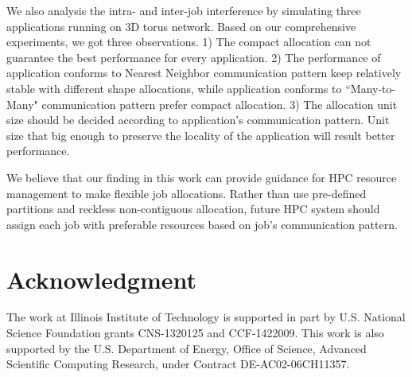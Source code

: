 \documentclass[conference]{IEEEtran}
\begin{document}
We also analysis the intra- and inter-job interference by simulating three applications running on 3D torus network. Based on our comprehensive experiments, we got three observations. 1) The compact allocation can not guarantee the best performance for every application. 2) The performance of application conforms to Nearest Neighbor communication pattern keep relatively stable with different shape allocations, while application conforms to ``Many-to-Many" communication pattern prefer compact allocation. 3) The allocation unit size should be decided according to application's communication pattern. Unit size that big enough to preserve the locality of the application will result better performance. 

We believe that our finding in this work can provide guidance for HPC resource management to make flexible job allocations. Rather than use pre-defined partitions and reckless non-contiguous allocation, future HPC system should assign each job with preferable resources based on job's communication pattern. 

\section*{Acknowledgment}
\label{sec: ack}
The work at Illinois Institute of Technology is supported in part by U.S. National Science Foundation grants CNS-1320125 and CCF-1422009. This work is also supported by the U.S. Department of Energy, Office of Science, Advanced Scientific Computing Research, under Contract DE-AC02-06CH11357.
\end{document}
